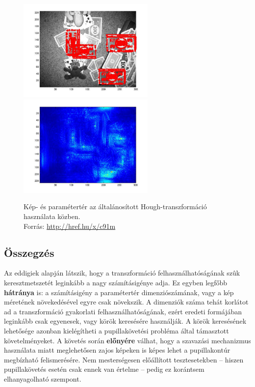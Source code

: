 \begin{figure}[!ht]
\centering
\includegraphics[width=67mm, keepaspectratio]{figures/generalhough_money_1.png}\hspace{1cm}
\includegraphics[width=67mm, keepaspectratio]{figures/generalhough_money_2.png}
\caption{Kép- és paramétertér az általánosított Hough-transzformáció használata közben.\\Forrás: \url{http://href.hu/x/c91m}}
\label{fig:generalhough}
\end{figure}

\subsection{Összegzés}\label{sect:hough_osszefoglalas}

Az eddigiek alapján látszik, hogy a transzformáció felhasználhatóságának szûk keresztmetszetét leginkább a nagy számításigénye adja. Ez egyben legfőbb \textbf{hátránya} is: a számításigény a paramétertér dimenziószámának, vagy a kép méretének növekedésével egyre csak növekszik. A dimenziók száma tehát korlátot ad a transzformáció gyakorlati felhasználhatóságának, ezért eredeti formájában leginkább csak egyenesek, vagy körök keresésére használják. A körök keresésének lehetősége azonban kielégítheti a pupillakövetési probléma által támasztott követelményeket. A követés során \textbf{előnyére} válhat, hogy a szavazási mechanizmus használata miatt meglehetősen zajos képeken is képes lehet a pupillakontúr megbízható felismerésére. Nem mesterségesen előállított tesztesetekben -- hiszen pupillakövetés esetén csak ennek van értelme -- pedig ez korántsem elhanyagolható szempont.


